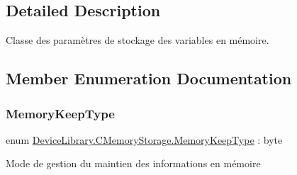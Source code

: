 \subsection{Detailed Description}
Classe des paramètres de stockage des variables en mémoire. 



\subsection{Member Enumeration Documentation}
\mbox{\label{class_device_library_1_1_c_memory_storage_a212a4301a9ee4074c52046fc8b36fb7a}} 
\subsubsection{\texorpdfstring{Memory\+Keep\+Type}{MemoryKeepType}}
{\footnotesize\ttfamily enum \mbox{\hyperlink{class_device_library_1_1_c_memory_storage_a212a4301a9ee4074c52046fc8b36fb7a}{Device\+Library.\+C\+Memory\+Storage.\+Memory\+Keep\+Type}} \+: byte\hspace{0.3cm}{\ttfamily [strong]}}



Mode de gestion du maintien des informations en mémoire 


